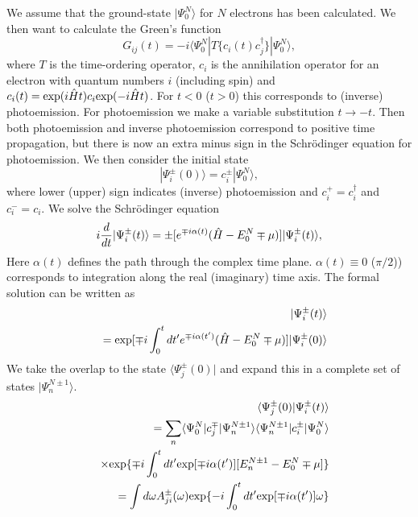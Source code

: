 We assume that the ground-state $|\Psi_0^N\rangle$ for $N$ electrons has been calculated.
We then want to calculate the Green's function
\begin{equation}\label{eq:g0}
G_{ij}(t)=-i\langle\Psi_0^N|T\lbrace c_i(t)c_j^{\dagger}\rbrace|\Psi_0^N\rangle,
\end{equation}
where $T$ is the time-ordering operator, $c_i$ is the annihilation operator for an electron 
with quantum numbers $i$ (including spin) and $c_i(t)={\rm exp}(i\hat Ht)c_i{\rm exp}(-i\hat Ht)$. 
For $t<0$ ($t>0$) this corresponds to (inverse) photoemission. For photoemission we make 
a variable substitution $t \to -t$. Then both photoemission and inverse photoemission 
correspond to positive time propagation, but there is now an extra minus sign in the 
Schr\"odinger equation for photoemission. We then consider the initial state
\begin{equation}\label{eq:g1}
|\Psi^{\pm}_i(0)\rangle=c_i^{\pm}|\Psi_0^N\rangle,
\end{equation}
where lower (upper) sign indicates (inverse) photoemission and $c_i^{+}=c_i^{\dagger}$ and $c_i^{-}=c_i$.
We solve the Schr\"odinger equation
\begin{equation}\label{eq:g2}
i{d\over dt}|\Psi_i^{\pm}(t)\rangle=\pm [ e^{\mp i\alpha(t)}(\hat H-E_0^N\mp \mu)]|\Psi_i^{\pm}(t)\rangle,
\end{equation}
Here $\alpha(t)$ defines the path through the complex time plane. 
$\alpha(t)\equiv 0$ ($\pi/2$)) corresponds to integration along the real (imaginary) time axis. 
The formal solution can be written as 
\begin{eqnarray}\label{eq:g3}
&&|\Psi_i^{\pm}(t)\rangle \\
&&={\rm exp}[ \mp i\int_0^t dt'e^{\mp i\alpha(t')}(\hat H-E_0^N\mp \mu)] |\Psi_i^{\pm}(0)\rangle \nonumber
\end{eqnarray}
We take the overlap to the state $\langle \Psi^{\pm}_j(0)|$ and expand this in a complete set of states
$|\Psi_n^{N \pm 1}\rangle$.
\begin{eqnarray}\label{eq:g4}
&& \langle \Psi_j^{\pm}(0)|\Psi_i^{\pm}(t)\rangle   \\
&&=\sum_n\langle \Psi_0^N|c^{\mp}_j|\Psi_n^{N\pm 1}\rangle   \langle \Psi_n^{N\pm 1}|c^{\pm}_i|\Psi_0^N\rangle  \nonumber  \\
&&\times {\rm exp}\lbrace \mp i\int_0^tdt' {\rm exp}[\mp i\alpha(t')] [E_n^{N\pm 1}-E_0^N\mp \mu]\rbrace  \nonumber \\
&&=\int d\omega A^{\pm}_{ji}(\omega){\rm exp}\lbrace -i\int_0^t dt' {\rm exp}[\mp i\alpha(t')]\omega\rbrace  \nonumber
\end{eqnarray}
